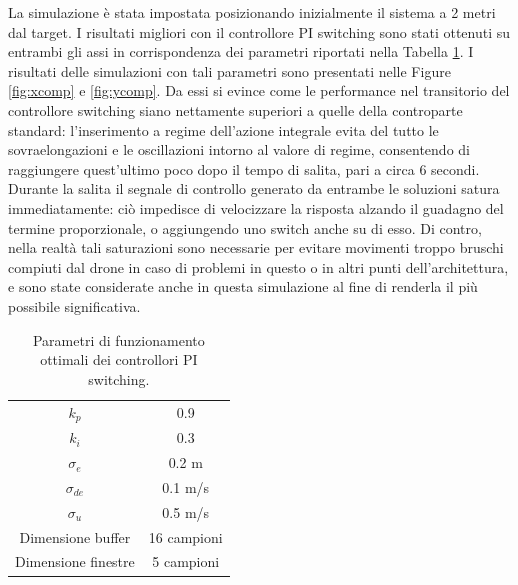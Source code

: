 La simulazione è stata impostata posizionando inizialmente il sistema a 2 metri dal target. I risultati migliori con il controllore PI switching sono stati ottenuti su entrambi gli assi in corrispondenza dei parametri riportati nella Tabella \ref{tab:cparams}. I risultati delle simulazioni con tali parametri sono presentati nelle Figure \ref{fig:xcomp} e \ref{fig:ycomp}. Da essi si evince come le performance nel transitorio del controllore switching siano nettamente superiori a quelle della controparte standard: l'inserimento a regime dell'azione integrale evita del tutto le sovraelongazioni e le oscillazioni intorno al valore di regime, consentendo di raggiungere quest'ultimo poco dopo il tempo di salita, pari a circa 6 secondi. Durante la salita il segnale di controllo generato da entrambe le soluzioni satura immediatamente: ciò impedisce di velocizzare la risposta alzando il guadagno del termine proporzionale, o aggiungendo uno switch anche su di esso. Di contro, nella realtà tali saturazioni sono necessarie per evitare movimenti troppo bruschi compiuti dal drone in caso di problemi in questo o in altri punti dell'architettura, e sono state considerate anche in questa simulazione al fine di renderla il più possibile significativa.

\begin{table}
    \centering
    \begin{tabular}{c|c}
        $k_p$ & 0.9 \\
        $k_i$ & 0.3 \\
        $\sigma_e$ & 0.2 m\\
        $\sigma_{de}$ & 0.1 m/s\\
        $\sigma_{u}$ & 0.5 m/s\\
        Dimensione buffer & 16 campioni\\
        Dimensione finestre & 5 campioni
    \end{tabular}
    \caption{Parametri di funzionamento ottimali dei controllori PI switching.}
    \label{tab:cparams}
\end{table}

